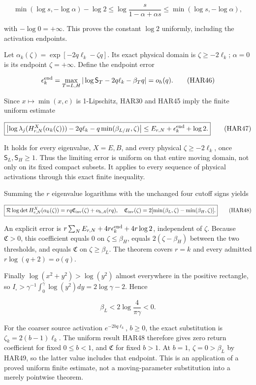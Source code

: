 \documentclass[11pt]{article}
\begin{document}
\[
\min(\log s,-\log\alpha)-\log2
\le\log\frac{s}{1-\alpha+\alpha s}
\le\min(\log s,-\log\alpha),
\tag{HAR45}
\]

with \(-\log0=+\infty\). This proves the constant \(\log2\) uniformly, including the activation endpoints.

Let \(\alpha_k(\zeta)=\exp[-2q\ell_k-\zeta q]\). Its exact physical domain is \(\zeta\ge-2\ell_k\); \(\alpha=0\) is its endpoint \(\zeta=+\infty\). Define the endpoint error

\[
\epsilon_k^{\rm end}=
\max_{T=L,H}|\log\mathsf S_T-2q\ell_k-\beta_Tq|=o_h(q).
\tag{HAR46}
\]

Since \(x\mapsto\min(x,c)\) is 1-Lipschitz, HAR30 and HAR45 imply the finite uniform estimate

\[
\boxed{
\left|\log\lambda_j(H^X_{r,N}(\alpha_k(\zeta)))
-2q\ell_k-q\min(\beta_{L/H},\zeta)\right|
\le E_{r,N}+\epsilon_k^{\rm end}+\log2.
}
\tag{HAR47}
\]

It holds for every eigenvalue, \(X=E,B\), and every physical \(\zeta\ge-2\ell_k\), once \(\mathsf S_L,\mathsf S_H\ge1\). Thus the limiting error is uniform on that entire moving domain, not only on its fixed compact subsets. It applies to every sequence of physical activations through this exact finite inequality.

Summing the \(r\) eigenvalue logarithms with the unchanged four cutoff signs yields

\[
\boxed{
\mathcal R\log\det H^X_{r,N}(\alpha_k(\zeta))
=rq\mathfrak C_{\rm inv}(\zeta)+o_{h,A}(rq),
\quad
\mathfrak C_{\rm inv}(\zeta)=2[\min(\beta_L,\zeta)-\min(\beta_H,\zeta)].
}
\tag{HAR48}
\]

An explicit error is \(r\sum_NE_{r,N}+4r\epsilon_k^{\rm end}+4r\log2\), independent of \(\zeta\). Because \(\mathfrak C>0\), this coefficient equals 0 on \(\zeta\le\beta_H\), equals \(2(\zeta-\beta_H)\) between the two thresholds, and equals \(\mathfrak C\) on \(\zeta\ge\beta_L\). The theorem covers \(r=k\) and every admitted \(r\log(q+2)=o(q)\).

Finally \(\log(x^2+y^2)>\log(y^2)\) almost everywhere in the positive rectangle, so \(I_\square>\gamma^{-1}\int_0^\gamma\log(y^2)dy=2\log\gamma-2\). Hence

\[
\beta_L<2\log\frac4{\pi\gamma}<0.
\tag{HAR49}
\]

For the coarser source activation \(e^{-2bq\ell_k}\), \(b\ge0\), the exact substitution is \(\zeta_k=2(b-1)\ell_k\). The uniform result HAR48 therefore gives zero return coefficient for fixed \(0\le b<1\), and \(\mathfrak C\) for fixed \(b>1\). At \(b=1\), \(\zeta=0>\beta_L\) by HAR49, so the latter value includes that endpoint. This is an application of a proved uniform finite estimate, not a moving-parameter substitution into a merely pointwise theorem.
\end{document}
